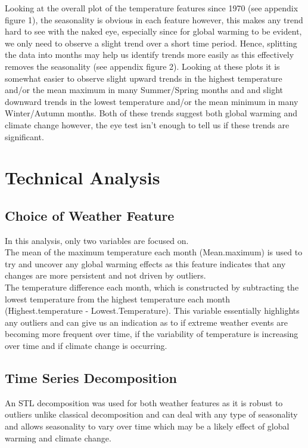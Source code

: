 \documentclass[12pt]{article}
\begin{document}
{Looking at the overall plot of the temperature features since 1970 (see appendix figure 1), the seasonality is obvious in each feature however, this makes any trend hard to see with the naked eye, especially since for global warming to be evident, we only need to observe a slight trend over a short time period. Hence, splitting the data into months may help us identify trends more easily as this effectively removes the seasonality (see appendix figure 2). Looking at these plots it is somewhat easier to observe slight upward trends in the highest temperature and/or the mean maximum in many Summer/Spring months and and slight downward trends in the lowest temperature and/or the mean minimum in many Winter/Autumn months. Both of these trends suggest both global warming and climate change however, the eye test isn't enough to tell us if these trends are significant.

\section*{Technical Analysis}
\subsection*{Choice of Weather Feature}
In this analysis, only two variables are focused on.\\

The mean of the maximum temperature each month (Mean.maximum) is used to try and uncover any global warming effects as this feature indicates that any changes are more persistent and not driven by outliers.\\

The temperature difference each month, which is constructed by subtracting the lowest temperature from the highest temperature each month (Highest.temperature - Lowest.Temperature). This variable essentially highlights any outliers and can give us an indication as to if extreme weather events are becoming more frequent over time, if the variability of temperature is increasing over time and if climate change is occurring.

\subsection*{Time Series Decomposition}
An STL decomposition was used for both weather features as it is robust to outliers unlike classical decomposition and can deal with any type of seasonality and allows seasonality to vary over time which may be a likely effect of global warming and climate change.\\

}
\end{document}
